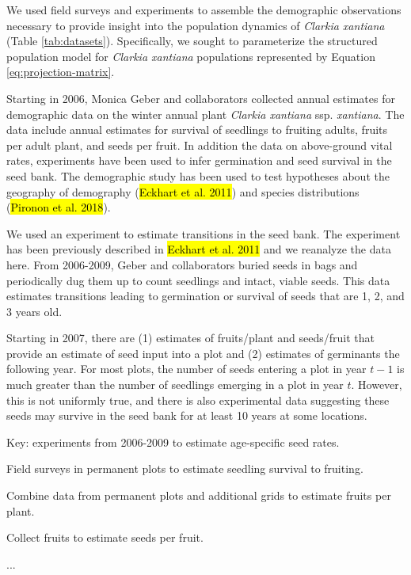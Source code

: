 \documentclass[12pt, oneside, titlepage]{article}   	%
\begin{document}
We used field surveys and experiments to assemble the demographic observations necessary to provide insight into the population dynamics of \textit{Clarkia xantiana} (Table \ref{tab:datasets}). Specifically, we sought to parameterize the structured population model for \textit{Clarkia xantiana} populations represented by Equation \ref{eq:projection-matrix}. 

Starting in 2006, Monica Geber and collaborators collected annual estimates for demographic data on the winter annual plant \textit{Clarkia xantiana} ssp. \textit{xantiana}. The data include annual estimates for survival of seedlings to fruiting adults, fruits per adult plant, and seeds per fruit. In addition the data on above-ground vital rates, experiments have been used to infer germination and seed survival in the seed bank. The demographic study has been used to test hypotheses about the geography of demography (\hl{Eckhart et al. 2011}) and species distributions (\hl{Pironon et al. 2018}).

We used an experiment to estimate transitions in the seed bank. The experiment has been previously described in \hl{Eckhart et al. 2011} and we reanalyze the data here. From 2006-2009, Geber and collaborators buried seeds in bags and periodically dug them up to count seedlings and intact, viable seeds. This data estimates transitions leading to germination or survival of seeds that are 1, 2, and 3 years old.

Starting in 2007, there are (1) estimates of fruits/plant and seeds/fruit that provide an estimate of seed input into a plot and (2) estimates of germinants the following year. For most plots, the number of seeds entering a plot in year $t-1$ is much greater than the number of seedlings emerging in a plot in year $t$. However, this is not uniformly true, and there is also experimental data suggesting these seeds may survive in the seed bank for at least 10 years at some locations.

Key: experiments from 2006-2009 to estimate age-specific seed rates.

Field surveys in permanent plots to estimate seedling survival to fruiting.

Combine data from permanent plots and additional grids to estimate fruits per plant.

Collect fruits to estimate seeds per fruit. 

\begin{singlespace*}...
 \label{tab:datasets} 
\begin{center}

\end{center}
\end{singlespace*}
\end{document}
